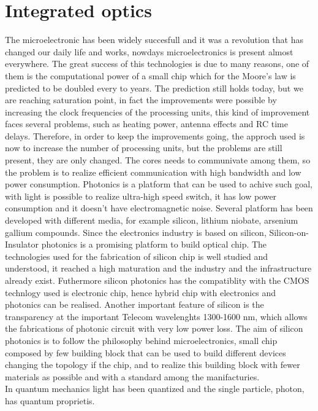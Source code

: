 \documentclass[10pt]{book}
\begin{document}
\section{Integrated optics}
The microelectronic has been widely succesfull and it was a revolution that has changed our daily life and works, nowdays microelectronics is present almost everywhere. The great success of this technologies is due to many reasons, one of them is the computational power of a small chip which for the Moore's law is predicted to be doubled every to years. The prediction still holds today, but we are reaching saturation point, in fact the improvements were possible by increasing the clock frequencies of the processing units, this kind of improvement faces several problems, such as heating power, antenna effects and RC time delays. Therefore, in order to keep the improvements going, the approch used is now to increase the number of processing units, but the problems are still present, they are only changed. The cores needs to communivate among them, so the problem is to realize efficient communication with high bandwidth and low power consumption. Photonics is a platform that can be used to achive such goal, with light is possible to realize ultra-high speed switch, it has low power consumption and it doesn't have electromagnetic noise. Several platform has been developed with different media, for example silicon, lithium niobate, arsenium gallium compounds. Since the electronics industry is based on silicon, Silicon-on-Insulator photonics is a promising platform to build optical chip. The technologies used for the fabrication of silicon chip is well studied and understood, it reached a high maturation and the industry and the infrastructure already exist. Futhermore silicon photonics has the compatiblity with the CMOS technlogy used is electronic chip, hence hybrid chip with electronics and photonics can be realised. Another important feature of silicon is the transparency at the important Telecom wavelenghts 1300-1600 nm, which allows the fabrications of photonic circuit with very low power loss. The aim of silicon photonics is to follow the philosophy behind microelectronics, small chip composed by few building block that can be used to build different devices changing the topology if the chip, and to realize this building block with fewer materials as possible and with a standard among the manifacturies.\\
In quantum mechanics light has been quantized and the single particle, photon, has quantum proprietis.
\end{document}

